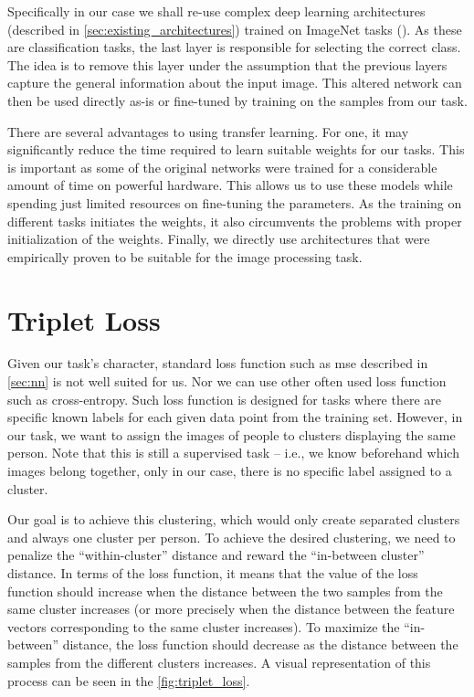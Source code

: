 Specifically in our case we shall re-use complex deep learning architectures (described in \autoref{sec:existing_architectures}) trained on ImageNet tasks (\cite{imagenetresults}). As these are classification tasks, the last layer is responsible for selecting the correct class. The idea is to remove this layer under the assumption that the previous layers capture the general information about the input image. This altered network can then be used directly as-is or fine-tuned by training on the samples from our task.

There are several advantages to using transfer learning. For one, it may significantly reduce the time required to learn suitable weights for our tasks. This is important as some of the original networks were trained for a considerable amount of time on powerful hardware. This allows us to use these models while spending just limited resources on fine-tuning the parameters. As the training on different tasks initiates the weights, it also circumvents the problems with proper initialization of the weights. Finally, we directly use architectures that were empirically proven to be suitable for the image processing task.

\section{Triplet Loss}

\label{sec:triplet_loss}

Given our task's character, standard loss function such as \gls{mse} described in \autoref{sec:nn} is not well suited for us. Nor we can use other often used loss function such as cross-entropy. Such loss function is designed for tasks where there are specific known labels for each given data point from the training set. However, in our task, we want to assign the images of people to clusters displaying the same person. Note that this is still a supervised task -- i.e., we know beforehand which images belong together, only in our case, there is no specific label assigned to a cluster.

Our goal is to achieve this clustering, which would only create separated clusters and always one cluster per person. To achieve the desired clustering, we need to penalize the ``within-cluster'' distance and reward the ``in-between cluster'' distance. In terms of the loss function, it means that the value of the loss function should increase when the distance between the two samples from the same cluster increases (or more precisely when the distance between the feature vectors corresponding to the same cluster increases). To maximize the ``in-between'' distance, the loss function should decrease as the distance between the samples from the different clusters increases. A visual representation of this process can be seen in the \autoref{fig:triplet_loss}.

